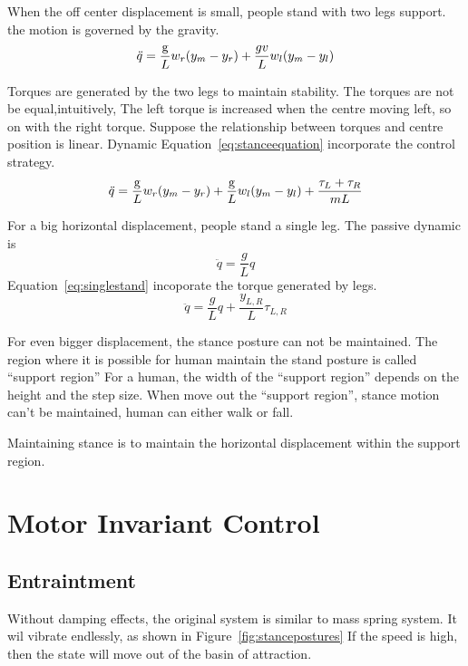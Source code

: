 \begin{itemize}
When the off center  displacement  is small, people stand with two legs support.
the motion is governed by the gravity.
\[
\ddot{q}=\frac{\mathrm{g}}{L}w_r(y_m-y_r)+\frac{gv}{L}w_l(y_m-y_l)
\]

Torques are generated by the two legs to maintain stability.
The torques are not be equal,intuitively,
The left torque is increased when the centre moving left, so on with the right torque.
Suppose the relationship between torques and centre position is linear.
Dynamic Equation~\ref{eq:stanceequation} incorporate the control strategy.
\begin{equation}
\label{eq:stanceequation}
\ddot{q}=\frac{\mathrm{g}}{L}w_r(y_m-y_r)+\frac{\mathrm{g}}{L}w_l(y_m-y_l)+\frac{\tau_L+\tau_R}{mL}
\end{equation}



For a big horizontal  displacement,  people stand a single leg.
The passive dynamic is
\[
\ddot{q}=\frac{g}{L}q
\]
Equation~\ref{eq:singlestand} incoporate the torque generated by legs.
\begin{equation}
\label{eq:singlestand}
\ddot{q}=\frac{g}{L}q+\frac{y_{L,R}}{L}\tau_{L,R}
\end{equation}

For even bigger displacement,  the stance posture can not be maintained.
The region where it is possible for human maintain the stand posture is called ``support region''
For a human, the width of the ``support region'' depends on the  height and the step size.
When move out the ``support region'', stance motion can't be maintained, human can either walk or fall.
\end{itemize}


Maintaining stance is to maintain the horizontal displacement within the support region.

\section {Motor Invariant Control}
\subsection{Entraintment}
Without damping effects, the original system is similar to mass spring system.
It wil vibrate endlessly, as shown in Figure~\ref{fig:stancepostures}
If the speed is high, then the state will move out of the basin of attraction.


